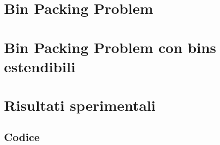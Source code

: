 \documentclass[a4paper]{report}
\begin{document}
\tableofcontents

\chapter{Bin Packing Problem}


\chapter{Bin Packing Problem con bins estendibili}


\chapter{Risultati sperimentali}


\printbibliography[heading=bibintoc]

\begin{appendices}
	\section*{Codice}
		\label{sec:Codice}
		
\end{appendices}
\end{document}
